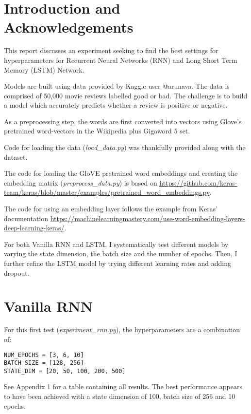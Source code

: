 \documentclass[letterpaper, 10pt]{article}
\begin{document}
\section{Introduction and Acknowledgements}

This report discusses an experiment seeking to find the best
settings for hyperparameters for Recurrent Neural Networks (RNN) and Long Short
Term Memory (LSTM) Network.

Models are built using data\cite{maas-EtAl:2011:ACL-HLT2011} provided by
Kaggle user @arunava. The data is comprised of
50,000 movie reviews labelled good or bad. The challenge is to build
a model which accurately predicts whether a review is positive or negative.

As a preprocessing step, the words are first converted into vectors using
Glove's\cite{pennington2014glove} pretrained word-vectors in the Wikipedia plus
Gigaword 5 set.

Code for loading the data ({\em load\_data.py}) was thankfully provided along with the
dataset.

The code for loading the GloVE pretrained word embeddings and creating the embedding
 matrix ({\em preprocess\_data.py}) is based on \url{https://github.com/keras-team/keras/blob/master/examples/pretrained\_word\_embeddings.py}.

The code for using an embedding layer follows the example from Keras' documentation \url{https://machinelearningmastery.com/use-word-embedding-layers-deep-learning-keras/}.


For both Vanilla RNN and LSTM, I systematically test different models by varying the
state dimension, the batch size and the number of epochs. Then, I further refine
the LSTM model by trying different learning rates and adding dropout.

\section{Vanilla RNN}

For this first test ({\em experiment\_rnn.py}), the hyperparameters are a combination
of:

\begin{verbatim}
NUM_EPOCHS = [3, 6, 10]
BATCH_SIZE = [128, 256]
STATE_DIM = [20, 50, 100, 200, 500]
\end{verbatim}

See Appendix 1 for a table containing all results.
The best performance appears to have been achieved with a state dimension of 100,
batch size of 256 and 10 epochs.
\end{document}
